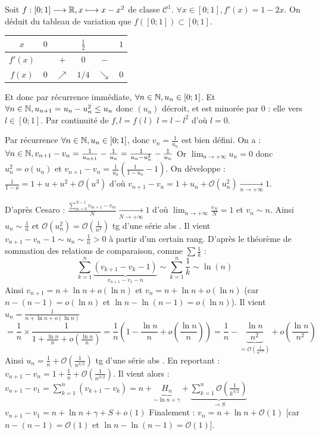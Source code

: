 \begin{solution}
Soit $f : [0; 1] \longrightarrow \mathbb R, x \longmapsto x - x^2$ de classe $\mathcal{C}^1$.
$\forall x \in [0; 1], f'(x) = 1 - 2x$.
On déduit du tableau de variation que $f([0; 1]) \subset [0; 1]$.
\begin{center}
\begin{tabular}{|c|lcccr|}
\hline
$x$ & $0$ & & $\frac{1}{2}$ & & $1$ \\
\hline
$f'(x)$ & & $+$ & $0$ & $-$ & \\
\hline
$f(x)$ & $0$ & $\nearrow$ & $1/4$ & $\searrow$ & $0$ \\
\hline
\end{tabular}
\end{center}
Et donc par récurrence immédiate, $\forall n \in \mathbb N, u_n \in [0; 1]$.
Et $\forall n \in \mathbb N, u_{n+1} = u_n - u_n^2 \leq u_n$ donc $(u_n)$ décroit, et est minorée par 0 : elle  vers $l \in [0; 1]$.
Par continuité de $f, l = f(l)$
$l = l - l^2$ d'où $\boxed{l = 0}$.

Par récurrence $\forall n \in \mathbb N, u_n \in \left]0; 1\right]$, donc $v_n = \frac{1}{u_n}$ est bien défini.
On a : $\forall n \in \mathbb N, v_{n+1} - v_n = \frac{1}{u_{n+1}} - \frac{1}{u_n} = \frac{1}{u_n - u_n^2} - \frac{1}{u_n}$
Or $\lim_{n \to +\infty} u_n = 0$ donc $u_n^2 = o(u_n)$ et $v_{n+1} - v_n = \frac{1}{u_n} \left( \frac{1}{1-u_n} - 1 \right)$.
On développe : $\frac{1}{1-u} = 1 + u + u^2 + \mathcal{O}(u^3)$
d'où $v_{n+1} - v_n = 1 + u_n + \mathcal{O}(u_n^2) \xrightarrow[n \to +\infty]{} 1$.

D'après Cesaro : $\frac{\sum_{m=0}^{N-1} v_{m+1} - v_m}{N} \xrightarrow[N \to +\infty]{} 1$ d'où $\lim_{n \to +\infty} \frac{v_N}{N} = 1$ et $v_n \sim n$.
Ainsi $u_n \sim \frac{1}{n}$ et $\mathcal{O}(u_n^2) = \mathcal{O}(\frac{1}{n^2})$ tg d'une série abs .
Il vient $v_{n+1} - v_n - 1 \sim u_n \sim \frac{1}{n} > 0$ à partir d'un certain rang.
D'après le théorème de sommation des relations de comparaison, comme $\sum \frac{1}{k}$  :
\[
\sum_{k=1}^n \underbrace{(v_{k+1} - v_k - 1)}_{v_{n+1} - v_1 - n} \sim \sum_{k=1}^n \frac{1}{k} \sim \ln(n)
\]
Ainsi $v_{n+1} = n + \ln n + o(\ln n)$ et $v_n = n + \ln n + o(\ln n)$ (car $n - (n-1) = o(\ln n)$ et $\ln n - \ln(n-1) = o(\ln n)$).
Il vient $u_n = \frac{1}{n + \ln n + o(\ln n)}$
\[
= \frac{1}{n} \times \frac{1}{1 + \frac{\ln n}{n} + o\left(\frac{\ln n}{n}\right)} = \frac{1}{n} \left( 1 - \frac{\ln n}{n} + o\left(\frac{\ln n}{n}\right) \right) = \frac{1}{n} - \underbrace{\frac{\ln n}{n^2}}_{= \mathcal{O}\left(\frac{1}{n^{3/2}}\right)} + o\left(\frac{\ln n}{n^2}\right)
\]
Ainsi $u_n = \frac{1}{n} + \mathcal{O}\left(\frac{1}{n^{3/2}}\right)$ tg d'une série abs .
En reportant : $v_{n+1} - v_n = 1 + \frac{1}{n} + \mathcal{O}\left(\frac{1}{n^{3/2}}\right)$. Il vient alors : $v_{n+1} - v_1 = \sum_{k=1}^n (v_{k+1} - v_k) = n + \underbrace{H_n}_{\sim \ln n + \gamma} + \underbrace{\sum_{k=1}^n \mathcal{O}\left(\frac{1}{k^{3/2}}\right)}_{\to S}$
$v_{n+1} - v_1 = n + \ln n + \gamma + S + o(1)$
Finalement : $\boxed{v_n = n + \ln n + \mathcal{O}(1)}$ [car $n - (n-1) = \mathcal{O}(1)$ et $\ln n - \ln(n-1) = \mathcal{O}(1)$].


\end{solution}
